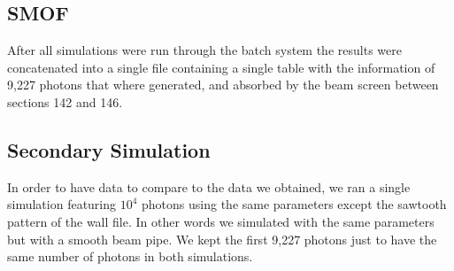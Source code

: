 
\subsection{SMOF}
After all simulations were run through the batch system the results were concatenated into a single file containing a single table with the information of 9,227 photons that where generated, and absorbed by the beam screen between sections 142 and 146.


\subsection{Secondary Simulation}
In order to have data to compare to the data we obtained, we ran a single simulation featuring $10^4$ photons using the same parameters except the sawtooth pattern of the wall file. In other words we simulated with the same parameters but with a smooth beam pipe. We kept the first 9,227 photons just to have the same number of photons in both simulations.

